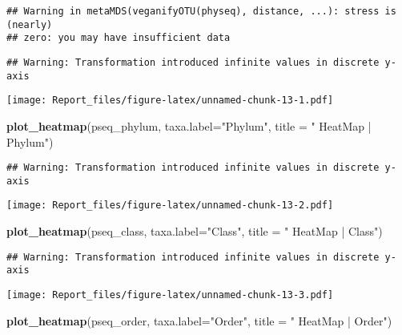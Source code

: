 \documentclass[]{article}
\newenvironment{Shaded}{\begin{snugshade}}{\end{snugshade}}
\newcommand{\DataTypeTok}[1]{\textcolor[rgb]{0.13,0.29,0.53}{#1}}
\newcommand{\KeywordTok}[1]{\textcolor[rgb]{0.13,0.29,0.53}{\textbf{#1}}}
\newcommand{\NormalTok}[1]{#1}
\newcommand{\StringTok}[1]{\textcolor[rgb]{0.31,0.60,0.02}{#1}}
\begin{document}
\begin{verbatim}
## Warning in metaMDS(veganifyOTU(physeq), distance, ...): stress is (nearly)
## zero: you may have insufficient data
\end{verbatim}

\begin{verbatim}
## Warning: Transformation introduced infinite values in discrete y-axis
\end{verbatim}

\texttt{[image: Report\_files/figure-latex/unnamed-chunk-13-1.pdf]}

\begin{Shaded}
\begin{Highlighting}[]
\KeywordTok{plot_heatmap}\NormalTok{(pseq_phylum, }\DataTypeTok{taxa.label=}\StringTok{"Phylum"}\NormalTok{, }\DataTypeTok{title =} \StringTok{" HeatMap | Phylum"}\NormalTok{)}
\end{Highlighting}
\end{Shaded}

\begin{verbatim}
## Warning: Transformation introduced infinite values in discrete y-axis
\end{verbatim}

\texttt{[image: Report\_files/figure-latex/unnamed-chunk-13-2.pdf]}

\begin{Shaded}
\begin{Highlighting}[]
\KeywordTok{plot_heatmap}\NormalTok{(pseq_class, }\DataTypeTok{taxa.label=}\StringTok{"Class"}\NormalTok{, }\DataTypeTok{title =} \StringTok{" HeatMap | Class"}\NormalTok{)}
\end{Highlighting}
\end{Shaded}

\begin{verbatim}
## Warning: Transformation introduced infinite values in discrete y-axis
\end{verbatim}

\texttt{[image: Report\_files/figure-latex/unnamed-chunk-13-3.pdf]}

\begin{Shaded}
\begin{Highlighting}[]
\KeywordTok{plot_heatmap}\NormalTok{(pseq_order, }\DataTypeTok{taxa.label=}\StringTok{"Order"}\NormalTok{, }\DataTypeTok{title =} \StringTok{" HeatMap | Order"}\NormalTok{)}
\end{Highlighting}
\end{Shaded}
\end{document}
